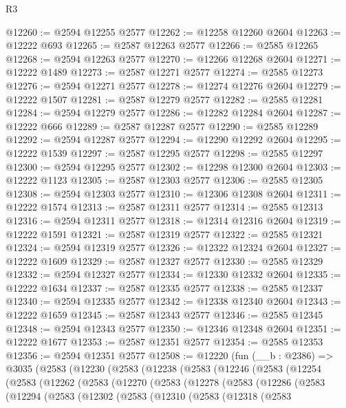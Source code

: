 \begin{lexlean}{R3}
\begin{coremodule}
@12260 := @2594 @12255 @2577
@12262 := @12258 @12260 @2604
@12263 := @12222 @693
@12265 := @2587 @12263 @2577
@12266 := @2585 @12265
@12268 := @2594 @12263 @2577
@12270 := @12266 @12268 @2604
@12271 := @12222 @1489
@12273 := @2587 @12271 @2577
@12274 := @2585 @12273
@12276 := @2594 @12271 @2577
@12278 := @12274 @12276 @2604
@12279 := @12222 @1507
@12281 := @2587 @12279 @2577
@12282 := @2585 @12281
@12284 := @2594 @12279 @2577
@12286 := @12282 @12284 @2604
@12287 := @12222 @666
@12289 := @2587 @12287 @2577
@12290 := @2585 @12289
@12292 := @2594 @12287 @2577
@12294 := @12290 @12292 @2604
@12295 := @12222 @1539
@12297 := @2587 @12295 @2577
@12298 := @2585 @12297
@12300 := @2594 @12295 @2577
@12302 := @12298 @12300 @2604
@12303 := @12222 @1123
@12305 := @2587 @12303 @2577
@12306 := @2585 @12305
@12308 := @2594 @12303 @2577
@12310 := @12306 @12308 @2604
@12311 := @12222 @1574
@12313 := @2587 @12311 @2577
@12314 := @2585 @12313
@12316 := @2594 @12311 @2577
@12318 := @12314 @12316 @2604
@12319 := @12222 @1591
@12321 := @2587 @12319 @2577
@12322 := @2585 @12321
@12324 := @2594 @12319 @2577
@12326 := @12322 @12324 @2604
@12327 := @12222 @1609
@12329 := @2587 @12327 @2577
@12330 := @2585 @12329
@12332 := @2594 @12327 @2577
@12334 := @12330 @12332 @2604
@12335 := @12222 @1634
@12337 := @2587 @12335 @2577
@12338 := @2585 @12337
@12340 := @2594 @12335 @2577
@12342 := @12338 @12340 @2604
@12343 := @12222 @1659
@12345 := @2587 @12343 @2577
@12346 := @2585 @12345
@12348 := @2594 @12343 @2577
@12350 := @12346 @12348 @2604
@12351 := @12222 @1677
@12353 := @2587 @12351 @2577
@12354 := @2585 @12353
@12356 := @2594 @12351 @2577
@12508 := @12220
    (fun (__b : @2386) =>
    @3035
      (@2583
        (@12230
          (@2583
            (@12238
              (@2583
                (@12246
                  (@2583
                    (@12254
                      (@2583
                        (@12262
                          (@2583
                            (@12270
                              (@2583
                                (@12278
                                  (@2583
                                    (@12286
                                      (@2583
                                        (@12294
                                          (@2583
                                            (@12302
                                              (@2583
                                                (@12310
                                                  (@2583
                                                    (@12318
                                                      (@2583

\end{coremodule}
\end{lexlean}
